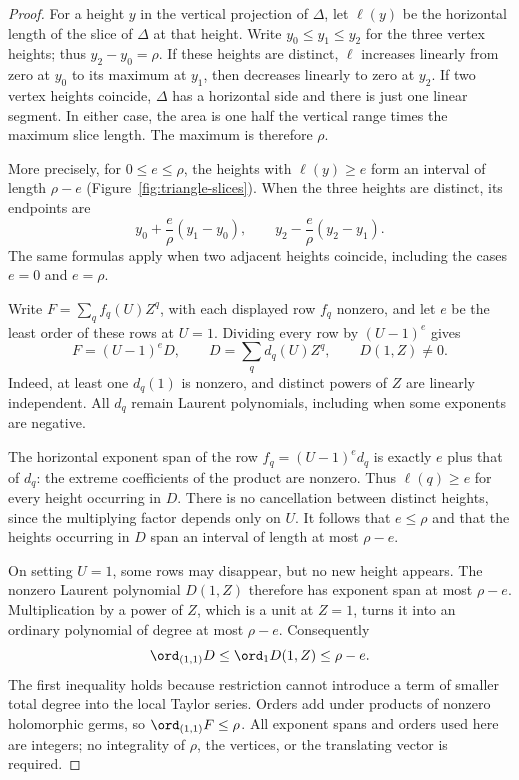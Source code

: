 \begin{proof}
For a height $y$ in the vertical projection of $\Delta$, let $\ell(y)$
be the horizontal length of the slice of $\Delta$ at that height.  Write
$y_0\leq y_1\leq y_2$ for the three vertex heights; thus
$y_2-y_0=\rho$.  If these heights are distinct, $\ell$ increases linearly
from zero at $y_0$ to its maximum at $y_1$, then decreases linearly to
zero at $y_2$.  If two vertex heights coincide, $\Delta$ has a horizontal
side and there is just one linear segment.  In either case, the area is
one half the vertical range times the maximum slice length.  The maximum
is therefore $\rho$.

More precisely, for $0\leq e\leq\rho$, the heights with
$\ell(y)\geq e$ form an interval of length $\rho-e$
(Figure~\ref{fig:triangle-slices}).  When the three
heights are distinct, its endpoints are
\[
 y_0+\frac e\rho(y_1-y_0),
 \qquad
 y_2-\frac e\rho(y_2-y_1).
\]
The same formulas apply when two adjacent heights coincide, including
the cases $e=0$ and $e=\rho$.

Write $F=\sum_q f_q(U)Z^q$, with each displayed row $f_q$ nonzero, and
let $e$ be the least order of these rows at $U=1$.  Dividing every row by
$(U-1)^e$ gives
\[
 F=(U-1)^eD,
 \qquad D=\sum_q d_q(U)Z^q,
 \qquad D(1,Z)\ne0.
\]
Indeed, at least one $d_q(1)$ is nonzero, and distinct powers of $Z$ are
linearly independent.  All $d_q$ remain Laurent polynomials, including
when some exponents are negative.

The horizontal exponent span of the row
$f_q=(U-1)^e d_q$ is exactly $e$ plus that of $d_q$: the extreme
coefficients of the product are nonzero.  Thus $\ell(q)\geq e$ for every
height occurring in $D$.  There is no cancellation between distinct
heights, since the multiplying factor depends only on $U$.  It follows
that $e\leq\rho$ and that the heights occurring in $D$ span an interval
of length at most $\rho-e$.

On setting $U=1$, some rows may disappear, but no new height appears.
The nonzero Laurent polynomial $D(1,Z)$ therefore has exponent span at
most $\rho-e$.  Multiplication by a power of $Z$, which is a unit at
$Z=1$, turns it into an ordinary polynomial of degree at most
$\rho-e$.  Consequently
\[
 \ord_{(1,1)}D
 \leq \ord_1 D(1,Z)
 \leq \rho-e.
\]
The first inequality holds because restriction cannot introduce a term
of smaller total degree into the local Taylor series.  Orders add under
products of nonzero holomorphic germs, so $\ord_{(1,1)}F\leq\rho$.
All exponent spans and orders used here are integers; no integrality of
$\rho$, the vertices, or the translating vector is required.
\end{proof}


